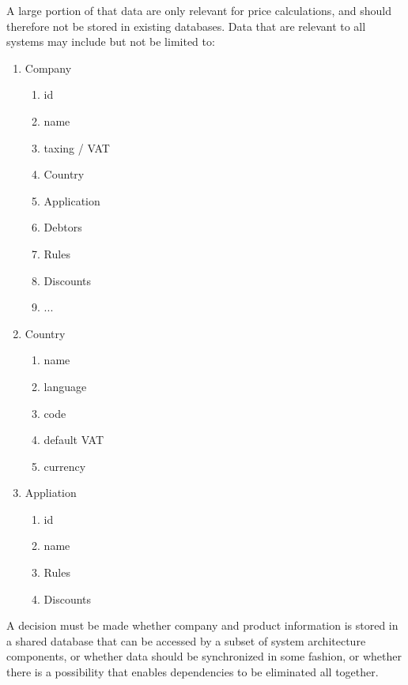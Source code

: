 A large portion of that data are only relevant for price calculations, and should therefore not be stored in existing databases. Data that are relevant to all systems may include but not be limited to:

\begin{enumerate}
	\item Company
				\begin{enumerate}
					\item id
		      \item name
		      \item taxing / VAT
		      \item Country
					\item Application
					\item Debtors
					\item Rules
					\item Discounts
					\item ...
	      \end{enumerate}
	\item Country
	      \begin{enumerate}
		      \item name
					\item language
					\item code
					\item default VAT
					\item currency
	      \end{enumerate}
	\item Appliation
				\begin{enumerate}
					\item id
					\item name
					\item Rules
					\item Discounts
	      \end{enumerate}
\end{enumerate}

A decision must be made whether company and product information is stored in a shared database that can be accessed by a subset of system architecture components, or whether data should be synchronized in some fashion, or whether there is a possibility that enables dependencies to be eliminated all together.

%
